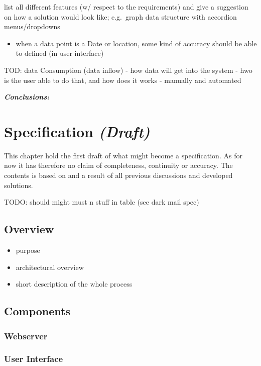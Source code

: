 \documentclass[12pt,english,a4paper,titlepage,cleardoublepage=empty,dottedtoc]{report}
\providecommand{\tightlist}{%
  \setlength{\itemsep}{0pt}\setlength{\parskip}{0pt}}
\begin{document}
list all different features (w/ respect to the requirements) and give a
suggestion on how a solution would look like; e.g.~graph data structure
with accordion menus/dropdowns

\begin{itemize}
\tightlist
\item
  when a data point is a Date or location, some kind of accuracy should
  be able to defined (in user interface)
\end{itemize}

TOD: data Consumption (data inflow) - how data will get into the system
- hwo is the user able to do that, and how does it works - manually and
automated

\emph{\textbf{Conclusions:}}

\chapter{\texorpdfstring{Specification
\emph{(Draft)}}{Specification (Draft)}}\label{specification-draft}

This chapter hold the first draft of what might become a specification.
As for now it has therefore no claim of completeness, continuity or
accuracy. The contents is based on and a result of all previous
discussions and developed solutions.

TODO: should might must n stuff in table (see dark mail spec)

\section{Overview}\label{overview}

\begin{itemize}
\tightlist
\item
  purpose
\item
  architectural overview
\item
  short description of the whole process
\end{itemize}

\section{Components}\label{components}

\subsection{Webserver}\label{webserver}

\subsection{User Interface}\label{user-interface-1}
\end{document}
